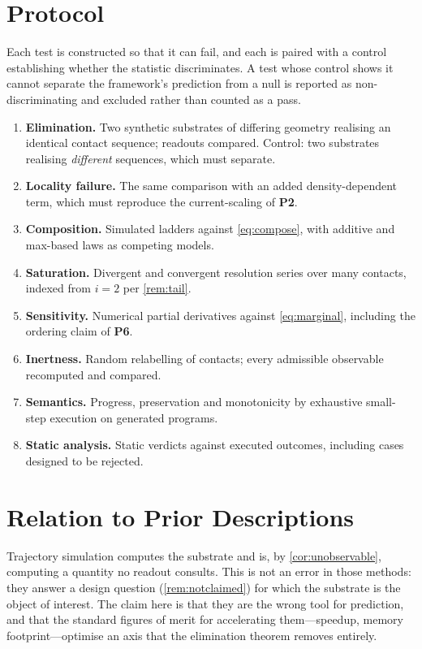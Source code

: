 \documentclass[11pt,a4paper]{article}
\theoremstyle{plain}
\theoremstyle{definition}
\theoremstyle{remark}
\begin{document}
\section{Protocol}
\label{sec:protocol}

Each test is constructed so that it can fail, and each is paired with a control
establishing whether the statistic discriminates. A test whose control shows it
cannot separate the framework's prediction from a null is reported as
non-discriminating and excluded rather than counted as a pass.

\begin{enumerate}[label=\textbf{V\arabic*.},leftmargin=3em,itemsep=0.4em]
\item \textbf{Elimination.} Two synthetic substrates of differing geometry
realising an identical contact sequence; readouts compared. Control: two
substrates realising \emph{different} sequences, which must separate.
\item \textbf{Locality failure.} The same comparison with an added
density-dependent term, which must reproduce the current-scaling of
\textbf{P2}.
\item \textbf{Composition.} Simulated ladders against \cref{eq:compose}, with
additive and max-based laws as competing models.
\item \textbf{Saturation.} Divergent and convergent resolution series over many
contacts, indexed from $i=2$ per \cref{rem:tail}.
\item \textbf{Sensitivity.} Numerical partial derivatives against
\cref{eq:marginal}, including the ordering claim of \textbf{P6}.
\item \textbf{Inertness.} Random relabelling of contacts; every admissible
observable recomputed and compared.
\item \textbf{Semantics.} Progress, preservation and monotonicity by exhaustive
small-step execution on generated programs.
\item \textbf{Static analysis.} Static verdicts against executed outcomes,
including cases designed to be rejected.
\end{enumerate}

\section{Relation to Prior Descriptions}
\label{sec:relation}

Trajectory simulation \citep{dahl2000simion} computes the substrate and is,
by \cref{cor:unobservable}, computing a quantity no readout consults. This is
not an error in those methods: they answer a design question
(\cref{rem:notclaimed}) for which the substrate is the object of interest. The
claim here is that they are the wrong tool for prediction, and that the standard
figures of merit for accelerating them---speedup, memory footprint---optimise an
axis that the elimination theorem removes entirely.
\end{document}
